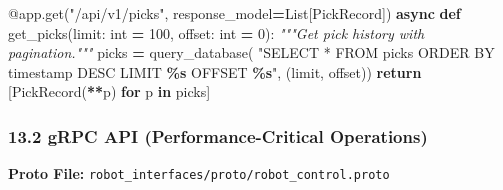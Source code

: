 \documentclass[
]{article}
\newenvironment{Shaded}{\begin{snugshade}}{\end{snugshade}}
\newcommand{\AttributeTok}[1]{\textcolor[rgb]{0.13,0.29,0.53}{#1}}
\newcommand{\BuiltInTok}[1]{#1}
\newcommand{\CommentTok}[1]{\textcolor[rgb]{0.56,0.35,0.01}{\textit{#1}}}
\newcommand{\ControlFlowTok}[1]{\textcolor[rgb]{0.13,0.29,0.53}{\textbf{#1}}}
\newcommand{\DecValTok}[1]{\textcolor[rgb]{0.00,0.00,0.81}{#1}}
\newcommand{\KeywordTok}[1]{\textcolor[rgb]{0.13,0.29,0.53}{\textbf{#1}}}
\newcommand{\NormalTok}[1]{#1}
\newcommand{\OperatorTok}[1]{\textcolor[rgb]{0.81,0.36,0.00}{\textbf{#1}}}
\newcommand{\SpecialCharTok}[1]{\textcolor[rgb]{0.81,0.36,0.00}{\textbf{#1}}}
\newcommand{\StringTok}[1]{\textcolor[rgb]{0.31,0.60,0.02}{#1}}
\begin{document}
\begin{Shaded}
\begin{Highlighting}[]
\AttributeTok{@app.get}\NormalTok{(}\StringTok{"/api/v1/picks"}\NormalTok{, response\_model}\OperatorTok{=}\NormalTok{List[PickRecord])}
\ControlFlowTok{async} \KeywordTok{def}\NormalTok{ get\_picks(limit: }\BuiltInTok{int} \OperatorTok{=} \DecValTok{100}\NormalTok{, offset: }\BuiltInTok{int} \OperatorTok{=} \DecValTok{0}\NormalTok{):}
    \CommentTok{"""Get pick history with pagination."""}
\NormalTok{    picks }\OperatorTok{=}\NormalTok{ query\_database(}
        \StringTok{"SELECT * FROM picks ORDER BY timestamp DESC LIMIT }\SpecialCharTok{\%s}\StringTok{ OFFSET }\SpecialCharTok{\%s}\StringTok{"}\NormalTok{,}
\NormalTok{        (limit, offset))}
    \ControlFlowTok{return}\NormalTok{ [PickRecord(}\OperatorTok{**}\NormalTok{p) }\ControlFlowTok{for}\NormalTok{ p }\KeywordTok{in}\NormalTok{ picks]}
\end{Highlighting}
\end{Shaded}

\hypertarget{grpc-api-performance-critical-operations}{%
\subsubsection{13.2 gRPC API (Performance-Critical
Operations)}\label{grpc-api-performance-critical-operations}}

\textbf{Proto File:}
\texttt{robot\_interfaces/proto/robot\_control.proto}
\end{document}
